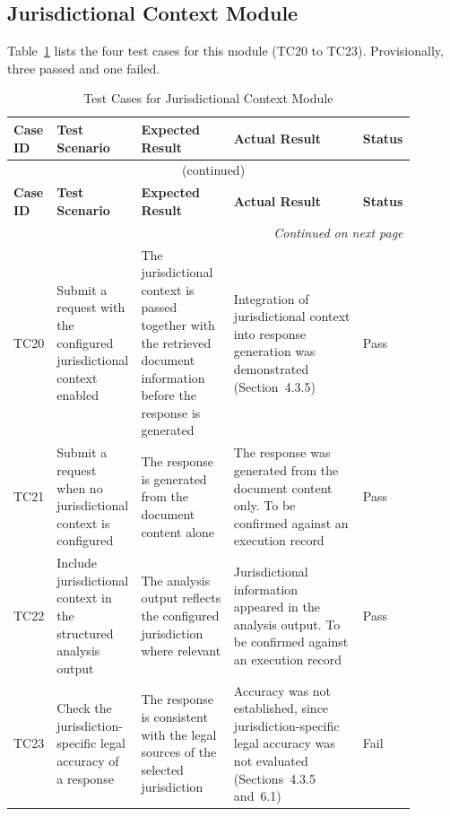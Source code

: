 \documentclass[12pt,a4paper,oneside]{report}
\begin{document}
\subsection{Jurisdictional Context Module}
Table~\ref{tab:juris} lists the four test cases for this module (TC20 to TC23). Provisionally, three passed and one failed.
{\footnotesize
\setlength{\tabcolsep}{3pt}
\renewcommand{\arraystretch}{1.15}
\begin{longtable}{|p{0.075\linewidth}|p{0.19\linewidth}|p{0.23\linewidth}|p{0.32\linewidth}|p{0.08\linewidth}|}
\caption{Test Cases for Jurisdictional Context Module}\label{tab:juris}\\
\hline
\textbf{Case ID} & \textbf{Test Scenario} & \textbf{Expected Result} & \textbf{Actual Result} & \textbf{Status}\\
\hline
\endfirsthead
\multicolumn{5}{c}{\tablename~\thetable{} (continued)}\\
\hline
\textbf{Case ID} & \textbf{Test Scenario} & \textbf{Expected Result} & \textbf{Actual Result} & \textbf{Status}\\
\hline
\endhead
\hline
\multicolumn{5}{r}{\emph{Continued on next page}}\\
\endfoot
\hline
\endlastfoot
TC20 & Submit a request with the configured jurisdictional context enabled & The jurisdictional context is passed together with the retrieved document information before the response is generated & Integration of jurisdictional context into response generation was demonstrated (Section~4.3.5) & Pass\\
\hline
TC21 & Submit a request when no jurisdictional context is configured & The response is generated from the document content alone & The response was generated from the document content only. To be confirmed against an execution record & Pass\\
\hline
TC22 & Include jurisdictional context in the structured analysis output & The analysis output reflects the configured jurisdiction where relevant & Jurisdictional information appeared in the analysis output. To be confirmed against an execution record & Pass\\
\hline
TC23 & Check the jurisdiction-specific legal accuracy of a response & The response is consistent with the legal sources of the selected jurisdiction & Accuracy was not established, since jurisdiction-specific legal accuracy was not evaluated (Sections~4.3.5 and~6.1) & Fail\\
\end{longtable}
}
\end{document}
